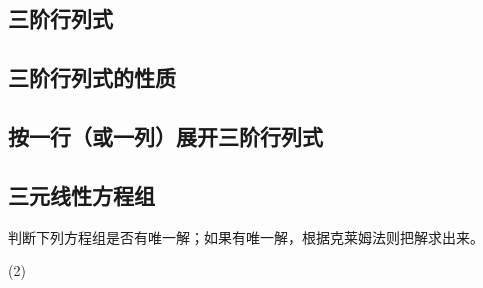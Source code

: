 \subsection{三阶行列式}
\begin{Practice}
  \begin{question}
    \item 
    \item 
    \item 
  \end{question}
\end{Practice}

\subsection{三阶行列式的性质}
\begin{Practice}
  \begin{question}
    \item 
    \item 
    \item 
  \end{question}
\end{Practice}

\subsection{按一行（或一列）展开三阶行列式}
\begin{Practice}
  \begin{question}
    \item 
    \item 
    \item 
    \item 
  \end{question}
\end{Practice}

\subsection{三元线性方程组}
\begin{Practice}
  判断下列方程组是否有唯一解；如果有唯一解，根据克莱姆法则把解求出来。
  \begin{tasks}(2)
    \task 
    \task 
    \task 
    \task 
  \end{tasks}
\end{Practice}

\begin{Exercise}
  \begin{question}
    \item 
    \item 
    \item 
    \item 
    \item 
    \item 
    \item 
    \item 
    \item 
    \item 
    \item 
    \item 
    \item 
  \end{question}
\end{Exercise}

